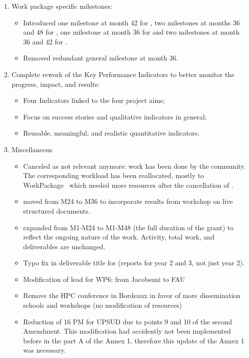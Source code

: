 \begin{enumerate}
\item Work package specific milestones:
  \begin{itemize}
  \item Introduced one milestone at month 42 for
    , two milestones at months 36 and 48
    for , one milestone at month 36 for  and two
    milestones at month 36 and 42 for .
  \item Removed redundant general milestone at month 36.
  \end{itemize}
\item Complete rework of the Key Performance Indicators to better
  monitor the progress, impact, and results:
  \begin{itemize}
  \item Four Indicators linked to the four project aims;
  \item Focus on success stories and qualitative indicators in general;
  \item Reusable, meaningful, and realistic quantitative indicators.
  \end{itemize} 
\item Miscellaneous
  \begin{itemize}
  \item Canceled  as
    not relevant anymore: work has been done by the community. The
    corresponding workload has been reallocated, mostly to
    WorkPackage~ which needed more resources after the cancellation of .
  \item {} moved from M24 to M36 to incorporate results
    from workshop on live structured documents.
  \item {} expanded from M1-M24 to M1-M48 (the full duration of the grant)
    to reflect the ongoing nature of the work. Activity, total work,
    and deliverables are unchanged.
  \item Typo fix in deliverable title for 
    (reports for year 2 and 3, not just year 2).
  \item Modification of lead for WP6: from Jacobsuni to FAU
  \item Remove the HPC conference in Bordeaux in favor of more dissemination schools and workshops (no modification of resources)
  \item Reduction of 16 PM for UPSUD due to points 9 and 10 of the second Amendment. This modification had accidently not been implemented before in the part A of the Annex 1, therefore this update of the Annex 1 was necessary.

\end{itemize}
\end{enumerate}
